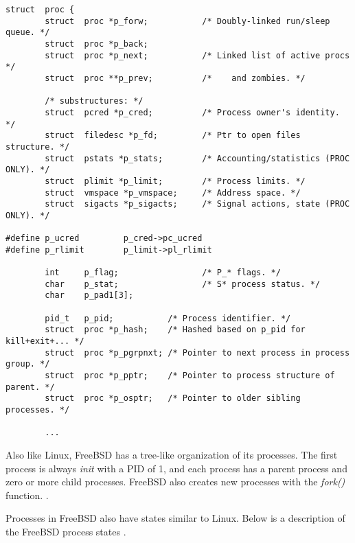 \documentclass[10pt,draftclsnofoot,onecolumn,journal,compsoc]{IEEEtran}
\begin{document}
\begin{lstlisting}[caption={Excerpt from \textit{proc} structure \cite{bsd_proc2}}]
struct  proc {
        struct  proc *p_forw;           /* Doubly-linked run/sleep queue. */
        struct  proc *p_back;
        struct  proc *p_next;           /* Linked list of active procs */
        struct  proc **p_prev;          /*    and zombies. */

        /* substructures: */
        struct  pcred *p_cred;          /* Process owner's identity. */
        struct  filedesc *p_fd;         /* Ptr to open files structure. */
        struct  pstats *p_stats;        /* Accounting/statistics (PROC ONLY). */
        struct  plimit *p_limit;        /* Process limits. */
        struct  vmspace *p_vmspace;     /* Address space. */
        struct  sigacts *p_sigacts;     /* Signal actions, state (PROC ONLY). */

#define p_ucred         p_cred->pc_ucred
#define p_rlimit        p_limit->pl_rlimit

        int     p_flag;                 /* P_* flags. */
        char    p_stat;                 /* S* process status. */
        char    p_pad1[3];

        pid_t   p_pid;           /* Process identifier. */
        struct  proc *p_hash;    /* Hashed based on p_pid for kill+exit+... */
        struct  proc *p_pgrpnxt; /* Pointer to next process in process group. */
        struct  proc *p_pptr;    /* Pointer to process structure of parent. */
        struct  proc *p_osptr;   /* Pointer to older sibling processes. */
        
        ...

\end{lstlisting}

Also like Linux, FreeBSD has a tree-like organization of its processes. The first process is always \textit{init} with a PID of 1, and each process has a parent process and zero or more child processes. FreeBSD also creates new processes with the \textit{fork()} function. \cite{bsd_proc3}.

Processes in FreeBSD also have states similar to Linux. Below is a description of the FreeBSD process states \cite{bsd_proc}.\\ \\
\end{document}

